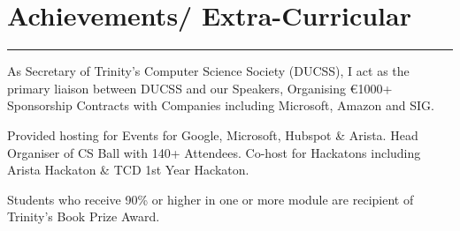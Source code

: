 \documentclass[]{rahulworld-resume}
\begin{document}
\begin{minipage}[t]{0.66\textwidth}



\section{Achievements/ Extra-Curricular} 
\noindent\rule{12.5cm}{0.4pt}

 
\descript{}
\noindent
\hspace{5em}%
\begin{minipage}{0.85\textwidth\vspace{2pt}}
As Secretary of Trinity's Computer Science Society (DUCSS), I act as the primary liaison between DUCSS and our Speakers, Organising €1000+ Sponsorship Contracts with Companies including Microsoft, Amazon and SIG. 
\end{minipage}

 
\descript{}
\noindent
\hspace{5em}%
\begin{minipage}{0.85\textwidth\vspace{2pt}}
Provided hosting for Events for Google, Microsoft, Hubspot \& Arista. Head Organiser of CS Ball with 140+ Attendees. Co-host for Hackatons including Arista Hackaton \& TCD 1st Year Hackaton.
\end{minipage}

\descript{}
\noindent
\hspace{5em}%
\begin{minipage}{0.85\textwidth\vspace{2pt}}
Students who receive 90\% or higher in one or more module are recipient of Trinity's Book Prize Award.
\end{minipage}


\end{minipage}
\end{document}
